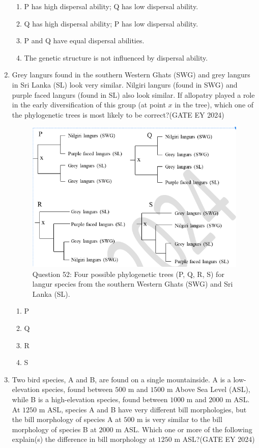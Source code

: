 \begin{enumerate}
    \begin{enumerate}
        \item P has high dispersal ability; Q has low dispersal ability.
        \item Q has high dispersal ability; P has low dispersal ability.
        \item P and Q have equal dispersal abilities.
        \item The genetic structure is not influenced by dispersal ability.
    \end{enumerate}
\item Grey langurs found in the southern Western Ghats (SWG) and grey langurs in Sri Lanka (SL) look very similar. Nilgiri langurs (found in SWG) and purple faced langurs (found in SL) also look similar. If allopatry played a role in the early diversification of this group (at point $x$ in the tree), which one of the phylogenetic trees is most likely to be correct?\hfill{(GATE EY 2024)}
\begin{figure}[!ht]
    \centering
    \includegraphics[width=0.8\columnwidth]{figs/Q-52.png}
    \caption{Question 52: Four possible phylogenetic trees (P, Q, R, S) for langur species from the southern Western Ghats (SWG) and Sri Lanka (SL).}
    \label{Q.52}
\end{figure}
    \begin{multicols}{2}
    \begin{enumerate}
        \item P
        \item Q
        \item R
        \item S
    \end{enumerate}
    \end{multicols}
\item Two bird species, A and B, are found on a single mountainside. A is a low-elevation species, found between $500$ m and $1500$ m Above Sea Level (ASL), while B is a high-elevation species, found between $1000$ m and $2000$ m ASL. At $1250$ m ASL, species A and B have very different bill morphologies, but the bill morphology of species A at $500$ m is very similar to the bill morphology of species B at $2000$ m ASL. Which one or more of the following explain(s) the difference in bill morphology at $1250$ m ASL?\hfill{(GATE EY 2024)}

\end{enumerate}

